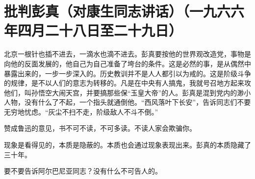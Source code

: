 \section[批判彭真（对康生同志讲话）（一九六六年四月二十八日至二十九日）]{批判彭真（对康生同志讲话）（一九六六年四月二十八日至二十九日）}


北京一根针也插不进去，一滴水也滴不进去。彭真要按他的世界观改造党，事物是向他的反面发展的，他自己为自己准备了垮台的条件。这是必然的事，是从偶然中暴露出来的，一步一步深入的。历史教训并不是人人都引以为戒的。这是阶级斗争的规律，是不以人们的意志为转移的。凡是在中央有人搞鬼，我就号召地方起来攻他们，叫孙悟空大闹天宫，并要搞那些保“玉皇大帝”的人。彭真是混到党内的渺小人物，没有什么了不起，一个指头就通倒他。“西风落叶下长安”，告诉同志们不要无穷地忧虑。“灰尘不扫不走，阶级敌人不斗不倒。”

赞成鲁迅的意见，书不可不读，不可多读。不读人家会欺骗你。

现象是看得见的，本质是隐蔽的。本质也会通过现象表现出来。彭真的本质隐藏了三十年。

要不要告诉阿尔巴尼亚同志？没有什么不可告人的。


